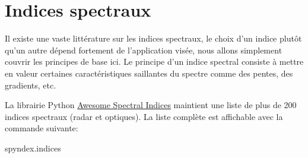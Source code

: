 \documentclass[
  11pt,
  letterpaper,
  open=any,
  twoside=false,
  french]{scrbook}
\newenvironment{Shaded}{\begin{snugshade}}{\end{snugshade}}
\newcommand{\NormalTok}[1]{\textcolor[rgb]{0.00,0.23,0.31}{#1}}
\begin{document}
\section{Indices spectraux}\label{indices-spectraux}

Il existe une vaste littérature sur les indices spectraux, le choix d'un
indice plutôt qu'un autre dépend fortement de l'application visée, nous
allons simplement couvrir les principes de base ici. Le principe d'un
indice spectral consiste à mettre en valeur certaines caractéristiques
saillantes du spectre comme des pentes, des gradients, etc.

La librairie Python
\href{https://awesome-ee-spectral-indices.readthedocs.io/en/latest/}{Awesome
Spectral Indices} maintient une liste de plus de 200 indices spectraux
(radar et optiques). La liste complète est affichable avec la commande
suivante:

\begin{Shaded}
\begin{Highlighting}[]
\NormalTok{spyndex.indices}
\end{Highlighting}
\end{Shaded}
\end{document}
